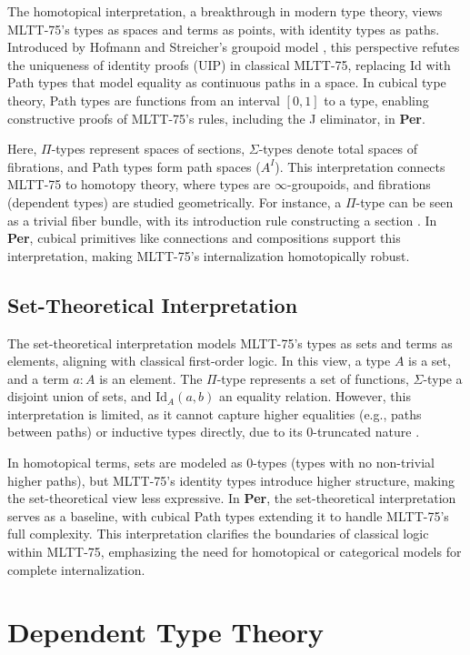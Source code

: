 \documentclass{article}
\begin{document}
The homotopical interpretation, a breakthrough in modern type theory,
views MLTT-75’s types as spaces and terms as points, with identity types as paths.
Introduced by Hofmann and Streicher’s groupoid model \cite{Hofmann96},
this perspective refutes the uniqueness of identity proofs (UIP) in
classical MLTT-75, replacing Id with Path types that model equality
as continuous paths in a space. In cubical type theory, Path types
are functions from an interval $[0,1]$ to a type, enabling constructive
proofs of MLTT-75’s rules, including the J eliminator, in \textbf{Per}.

Here, $\Pi$-types represent spaces of sections, $\Sigma$-types denote
total spaces of fibrations, and Path types form path spaces ($A^I$).
This interpretation connects MLTT-75 to homotopy theory, where types
are $\infty$-groupoids, and fibrations (dependent types) are studied
geometrically. For instance, a $\Pi$-type can be seen as a trivial fiber
bundle, with its introduction rule constructing a section \cite{HoTT13}.
In \textbf{Per}, cubical primitives like connections and compositions support
this interpretation, making MLTT-75’s internalization homotopically robust.

\subsection{Set-Theoretical Interpretation}

The set-theoretical interpretation models MLTT-75’s types as sets and
terms as elements, aligning with classical first-order logic. In this
view, a type $A$ is a set, and a term $a : A$ is an element. The $\Pi$-type
represents a set of functions, $\Sigma$-type a disjoint union of sets,
and $\text{Id}_A(a, b)$ an equality relation. However, this interpretation
is limited, as it cannot capture higher equalities (e.g., paths between paths)
or inductive types directly, due to its 0-truncated nature \cite{HoTT13}.

In homotopical terms, sets are modeled as 0-types (types with no non-trivial
higher paths), but MLTT-75’s identity types introduce higher structure,
making the set-theoretical view less expressive. In \textbf{Per}, the
set-theoretical interpretation serves as a baseline, with cubical Path
types extending it to handle MLTT-75’s full complexity. This interpretation
clarifies the boundaries of classical logic within MLTT-75, emphasizing
the need for homotopical or categorical models for complete internalization.

\section{Dependent Type Theory}
\end{document}
